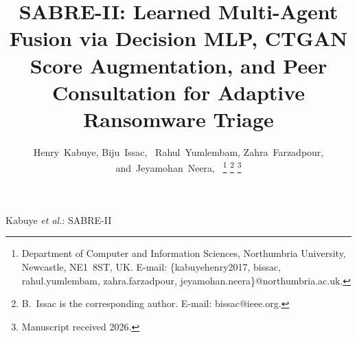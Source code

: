 \documentclass[journal]{IEEEtran}
\begin{document}
\title{SABRE-II: Learned Multi-Agent Fusion via Decision MLP,
CTGAN Score Augmentation, and Peer Consultation for
Adaptive Ransomware Triage}

\author{Henry~Kabuye,
        Biju~Issac,~
        Rahul~Yumlembam,
        Zahra~Farzadpour,
        and~Jeyamohan~Neera,~%
\thanks{Department of Computer and Information Sciences,
Northumbria University, Newcastle, NE1~8ST, UK\@.
E-mail: \{kabuyehenry2017, bissac, rahul.yumlembam, zahra.farzadpour, jeyamohan.neera\}@northumbria.ac.uk.}%
\thanks{B.~Issac is the corresponding author.
E-mail: bissac@ieee.org.}%
\thanks{Manuscript received 2026.}}

%
{Kabuye \emph{et al.}: SABRE-II}

\maketitle
\end{document}
